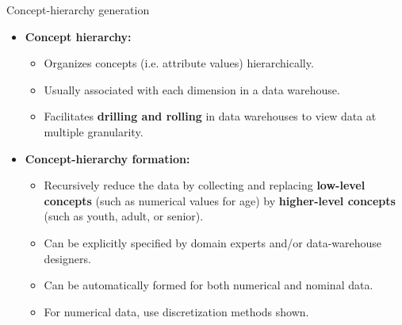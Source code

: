 \documentclass[aspectratio=169,t]{beamer}
\begin{document}
  { 
    \begin{frame}{Concept-hierarchy generation}
        \begin{itemize}
            \item \textbf{Concept hierarchy:}
            \begin{itemize}
              \item Organizes concepts (i.e. attribute values) hierarchically.
              \item Usually associated with each dimension in a data warehouse.
              \item Facilitates \textbf{drilling and rolling} in data warehouses to view data at multiple granularity.
            \end{itemize}
            \item \textbf{Concept-hierarchy formation:}
            \begin{itemize}
              \item Recursively reduce the data by collecting and replacing \textbf{low-level concepts} (such as numerical values for age) by \textbf{higher-level concepts} (such as youth, adult, or senior).
              \item Can be explicitly specified by domain experts and/or data-warehouse designers.
              \item Can be automatically formed for both numerical and nominal data.
              \item For numerical data, use discretization methods shown.
            \end{itemize}
        \end{itemize}
    \end{frame}
  }
\end{document}
